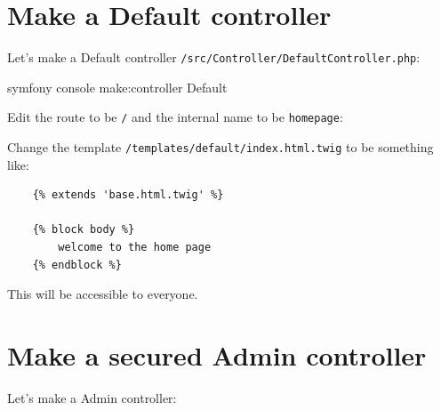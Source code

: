 \documentclass[a4paperpaper,openright]{book}
\newenvironment{Shaded}{}{}
\newcommand{\AnnotationTok}[1]{\textcolor[rgb]{0.38,0.63,0.69}{\textbf{\textit{#1}}}}
\newcommand{\CommentTok}[1]{\textcolor[rgb]{0.38,0.63,0.69}{\textit{#1}}}
\newcommand{\ExtensionTok}[1]{#1}
\newcommand{\KeywordTok}[1]{\textcolor[rgb]{0.00,0.44,0.13}{\textbf{#1}}}
\newcommand{\NormalTok}[1]{#1}
\newcommand{\OtherTok}[1]{\textcolor[rgb]{0.00,0.44,0.13}{#1}}
\newcommand{\StringTok}[1]{\textcolor[rgb]{0.25,0.44,0.63}{#1}}
\begin{document}
\hypertarget{make-a-default-controller}{%
\section{Make a Default controller}\label{make-a-default-controller}}

Let's make a Default controller
\texttt{/src/Controller/DefaultController.php}:

\begin{Shaded}
\begin{Highlighting}[]
    \ExtensionTok{symfony}\NormalTok{ console make:controller Default}
\end{Highlighting}
\end{Shaded}

Edit the route to be \texttt{/} and the internal name to be
\texttt{homepage}:

\begin{Shaded}
\end{Shaded}

Change the template \texttt{/templates/default/index.html.twig} to be
something like:

\begin{verbatim}
    {% extends 'base.html.twig' %}

    {% block body %}
        welcome to the home page
    {% endblock %}
\end{verbatim}

This will be accessible to everyone.

\hypertarget{make-a-secured-admin-controller}{%
\section{Make a secured Admin
controller}\label{make-a-secured-admin-controller}}

Let's make a Admin controller:
\end{document}
